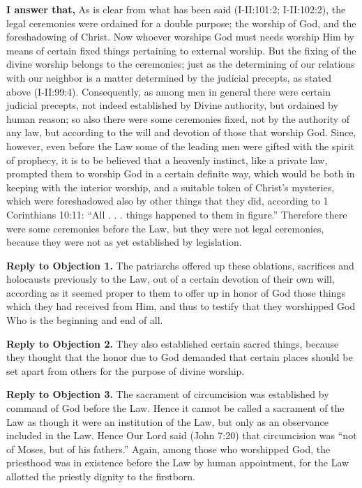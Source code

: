 \textbf{I answer that,} As is clear from what has been said (I-II:101:2; I-II:102:2), the legal ceremonies were ordained for a double purpose; the worship of God, and the foreshadowing of Christ. Now whoever worships God must needs worship Him by means of certain fixed things pertaining to external worship. But the fixing of the divine worship belongs to the ceremonies; just as the determining of our relations with our neighbor is a matter determined by the judicial precepts, as stated above (I-II:99:4). Consequently, as among men in general there were certain judicial precepts, not indeed established by Divine authority, but ordained by human reason; so also there were some ceremonies fixed, not by the authority of any law, but according to the will and devotion of those that worship God. Since, however, even before the Law some of the leading men were gifted with the spirit of prophecy, it is to be believed that a heavenly instinct, like a private law, prompted them to worship God in a certain definite way, which would be both in keeping with the interior worship, and a suitable token of Christ's mysteries, which were foreshadowed also by other things that they did, according to 1 Corinthians 10:11: ``All . . . things happened to them in figure.'' Therefore there were some ceremonies before the Law, but they were not legal ceremonies, because they were not as yet established by legislation.

\textbf{Reply to Objection 1.} The patriarchs offered up these oblations, sacrifices and holocausts previously to the Law, out of a certain devotion of their own will, according as it seemed proper to them to offer up in honor of God those things which they had received from Him, and thus to testify that they worshipped God Who is the beginning and end of all.

\textbf{Reply to Objection 2.} They also established certain sacred things, because they thought that the honor due to God demanded that certain places should be set apart from others for the purpose of divine worship.

\textbf{Reply to Objection 3.} The sacrament of circumcision was established by command of God before the Law. Hence it cannot be called a sacrament of the Law as though it were an institution of the Law, but only as an observance included in the Law. Hence Our Lord said (John 7:20) that circumcision was ``not of Moses, but of his fathers.'' Again, among those who worshipped God, the priesthood was in existence before the Law by human appointment, for the Law allotted the priestly dignity to the firstborn.

